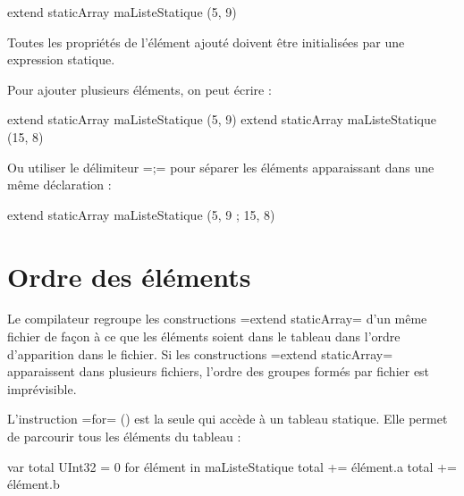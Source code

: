 \begin{PLM}
extend staticArray maListeStatique (5, 9)
\end{PLM}

Toutes les propriétés de l'élément ajouté doivent être initialisées par une expression statique. 

Pour ajouter plusieurs éléments, on peut écrire :
\begin{PLM}
extend staticArray maListeStatique (5, 9)
extend staticArray maListeStatique (15, 8)
\end{PLM}

Ou utiliser le délimiteur \plm=;= pour séparer les éléments apparaissant dans une même déclaration :
\begin{PLM}
extend staticArray maListeStatique (5, 9 ; 15, 8)
\end{PLM}

\section{Ordre des éléments}

Le compilateur regroupe les constructions \plm=extend staticArray= d'un même fichier de façon à ce que les éléments soient dans le tableau dans l'ordre d'apparition dans le fichier. Si les constructions \plm=extend staticArray= apparaissent dans plusieurs fichiers, l'ordre des groupes formés par fichier est imprévisible.









L'instruction \plm=for= () est la seule qui accède à un tableau statique. Elle permet de parcourir tous les éléments du tableau :

\begin{PLM}
var total UInt32 = 0
for élément in maListeStatique {
  total += élément.a
  total += élément.b
}
\end{PLM}

